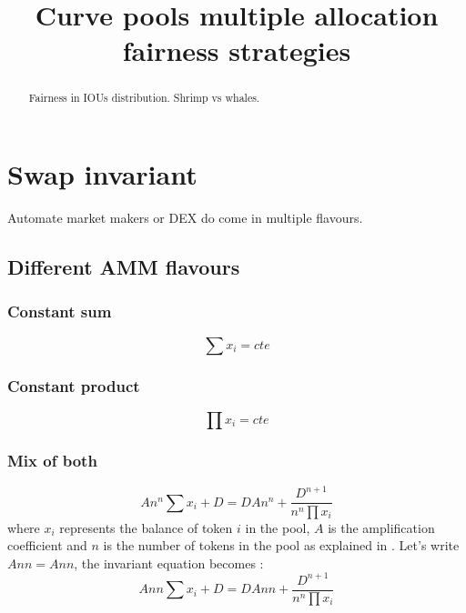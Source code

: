 \documentclass[conference]{IEEEtran}
\begin{document}
\title{Curve pools multiple allocation fairness strategies}

\author{
}

\maketitle

\begin{abstract}
Fairness in IOUs distribution. Shrimp vs whales.\\

\end{abstract}
\section{Swap invariant}
Automate market makers or DEX do come in multiple flavours.
\subsection{Different AMM flavours}
\subsubsection{Constant sum}
\begin{equation}
\sum x_i = cte
\end{equation}
\subsubsection{Constant product}
\begin{equation}
\prod x_i = cte
\end{equation}

\subsubsection{Mix of both}
\begin{equation}\label{eq:invariant}
An^n \sum x_i + D = DAn^n +\frac{D^{n+1}}{n^n\prod x_i} 
\end{equation}
where $x_i$ represents the balance of token $i$ in the pool, $A$ is the amplification coefficient and $n$ is the number of tokens in the pool as explained in \cite{https://curve.fi/files/stableswap-paper.pdf}.
Let's write $Ann = Ann$, the invariant equation becomes :
\begin{equation}\label{eq:invariant}
Ann \sum x_i + D = DAnn +\frac{D^{n+1}}{n^n\prod x_i} 
\end{equation}\label{eq:invariant}
\end{document}
